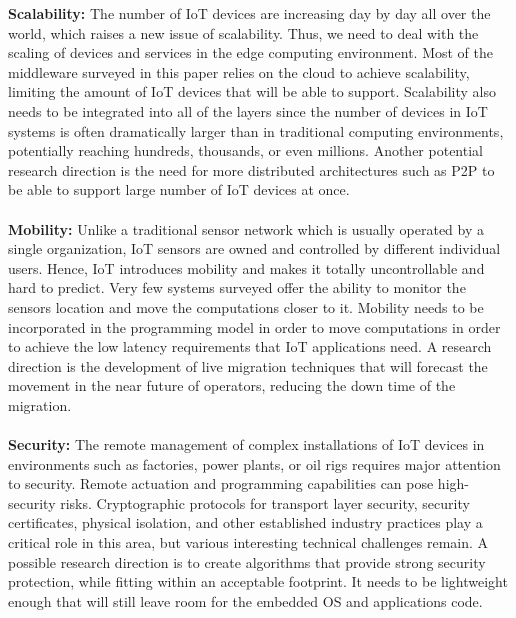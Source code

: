 \textbf{Scalability:} The number of IoT devices are increasing day by day all over the world, which raises a new issue of scalability. Thus, we need to deal with the scaling of devices and services in the edge computing environment. Most of the middleware surveyed in this paper relies on the cloud to achieve scalability, limiting the amount of IoT devices that will be able to support. Scalability also needs to be integrated into all of the layers since the number of devices in IoT systems is often dramatically larger than in traditional computing environments, potentially reaching hundreds, thousands, or even millions. Another potential research direction is the need for more distributed architectures such as P2P to be able to support large number of IoT devices at once. 
\\\\
\textbf{Mobility:} Unlike a traditional sensor network which is usually operated by a single organization, IoT sensors are owned and controlled by different individual users. Hence, IoT introduces mobility and makes it totally uncontrollable and hard to predict. Very few systems surveyed offer the ability to monitor the sensors location and move the computations closer to it. Mobility needs to be incorporated in the programming model in order to move computations in order to achieve the low latency requirements that IoT applications need. A research direction is the development of live migration techniques that will forecast the movement in the near future of operators, reducing the down time of the migration.
\\\\
\textbf{Security:} The remote management of complex installations of IoT devices in environments such as factories, power plants, or oil rigs requires major attention to security. Remote actuation and programming capabilities can pose high-security risks. Cryptographic protocols for transport layer security, security certificates, physical isolation, and other established industry practices play a critical role in this area, but various interesting technical challenges remain. A possible research direction is to create algorithms that provide strong security protection, while fitting within an acceptable footprint. It needs to be lightweight enough that will still leave room for the embedded OS and applications code. 